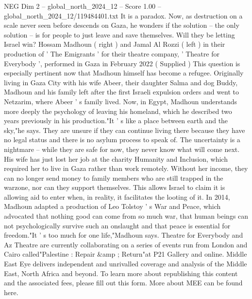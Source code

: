 \begin{textsample}{NEG Dim 2 – global\_north\_2024\_12 – Score 1.00 – global\_north\_2024\_12/119484401.txt}
It is a paradox.
Now, as destruction on a scale never seen before descends on Gaza, he wonders if the solution -- the only solution -- is for people to just leave and save themselves.
Will they be letting Israel win?
Hossam Madhoun ( right ) and Jamal Al Rozzi ( left ) in their production of ' The Emigrants ' for their theatre company, ' Theatre for Everybody ', performed in Gaza in February 2022 ( Supplied ) This question is especially pertinent now that Madhoun himself has become a refugee.
Originally living in Gaza City with his wife Abeer, their daughter Salma and dog Buddy, Madhoun and his family left after the first Israeli expulsion orders and went to Netzarim, where Abeer ' s family lived.
Now, in Egypt, Madhoun understands more deeply the psychology of leaving his homeland, which he described two years previously in his production."It ' s like a place between earth and the sky,"he says.
They are unsure if they can continue living there because they have no legal status and there is no asylum process to speak of.
The uncertainty is a nightmare -- while they are safe for now, they never know what will come next.
His wife has just lost her job at the charity Humanity and Inclusion, which required her to live in Gaza rather than work remotely.
Without her income, they can no longer send money to family members who are still trapped in the warzone, nor can they support themselves.
This allows Israel to claim it is allowing aid to enter when, in reality, it facilitates the looting of it.
In 2014, Madhoun adapted a production of Leo Tolstoy ' s War and Peace, which advocated that nothing good can come from so much war, that human beings can not psychologically survive such an onslaught and that peace is essential for freedom."It ' s too much for one life,"Madhoun says.
Theatre for Everybody and Az Theatre are currently collaborating on a series of events run from London and Cairo called"Palestine : Repair \&amp ; Return"at P21 Gallery and online.
Middle East Eye delivers independent and unrivalled coverage and analysis of the Middle East, North Africa and beyond.
To learn more about republishing this content and the associated fees, please fill out this form.
More about MEE can be found here.

\end{textsample}
